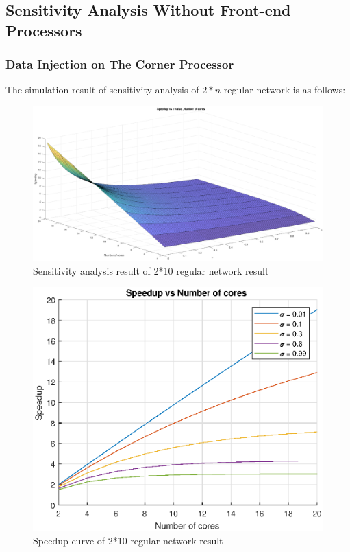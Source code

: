 \subsection{Sensitivity Analysis Without Front-end Processors}
\subsubsection{Data Injection on The Corner Processor}
The simulation result of sensitivity analysis of $2*n$ regular network  is as follows:
\begin{figure}[!ht]
\centering
\includegraphics[width=1\columnwidth]{figure/sa2t10c_no.eps}
\caption{Sensitivity analysis result of 2*10 regular network result}
\label{fig:sa2t10c_no}
\end{figure}


\begin{figure}[!ht]
\centering
\includegraphics[width=1\columnwidth]{figure/sa2t10c_no_curve.eps}
\caption{Speedup curve of 2*10 regular network result}
\label{fig:sa2t10c_no_curve}
\end{figure}


